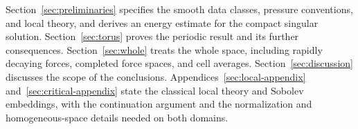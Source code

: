 Section~\ref{sec:preliminaries} specifies the smooth data classes,
pressure conventions, and local theory, and derives an energy estimate
for the compact singular solution. Section~\ref{sec:torus} proves the periodic
result and its further consequences. Section~\ref{sec:whole} treats the
whole space, including rapidly decaying forces, completed force spaces,
and cell averages. Section~\ref{sec:discussion} discusses the scope of
the conclusions. Appendices~\ref{sec:local-appendix}
and~\ref{sec:critical-appendix} state the classical local theory and
Sobolev embeddings, with the continuation argument and the
normalization and homogeneous-space details needed on both domains.
